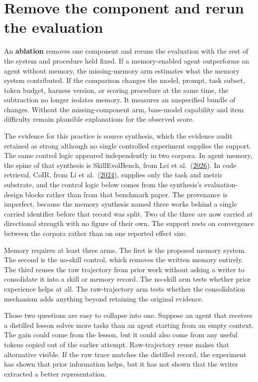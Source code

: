\section{Remove the component and rerun the evaluation}\label{remove-the-component-and-rerun-the-evaluation}

An \textbf{ablation} removes one component and reruns the evaluation with the rest of the system and procedure held fixed. If a memory-enabled agent outperforms an agent without memory, the missing-memory arm estimates what the memory system contributed. If the comparison changes the model, prompt, task subset, token budget, harness version, or scoring procedure at the same time, the subtraction no longer isolates memory. It measures an unspecified bundle of changes. Without the missing-component arm, base-model capability and item difficulty remain plausible explanations for the observed score.

The evidence for this practice is source synthesis, which the evidence audit retained as strong although no single controlled experiment supplies the support. The same control logic appeared independently in two corpora. In agent memory, the spine of that synthesis is SkillEvolBench, from Lei et al.~(\href{https://arxiv.org/abs/2605.24117}{2026}). In code retrieval, CoIR, from Li et al.~(\href{https://arxiv.org/abs/2407.02883}{2024}), supplies only the task and metric substrate, and the control logic below comes from the synthesis's evaluation-design blocks rather than from that benchmark paper. The provenance is imperfect, because the memory synthesis named three works behind a single carried identifier before that record was split. Two of the three are now carried at directional strength with no figure of their own. The support rests on convergence between the corpora rather than on one reported effect size.

Memory requires at least three arms. The first is the proposed memory system. The second is the no-skill control, which removes the written memory entirely. The third reuses the raw trajectory from prior work without asking a writer to consolidate it into a skill or memory record. The no-skill arm tests whether prior experience helps at all. The raw-trajectory arm tests whether the consolidation mechanism adds anything beyond retaining the original evidence.

Those two questions are easy to collapse into one. Suppose an agent that receives a distilled lesson solves more tasks than an agent starting from an empty context. The gain could come from the lesson, but it could also come from any useful tokens copied out of the earlier attempt. Raw-trajectory reuse makes that alternative visible. If the raw trace matches the distilled record, the experiment has shown that prior information helps, but it has not shown that the writer extracted a better representation.

